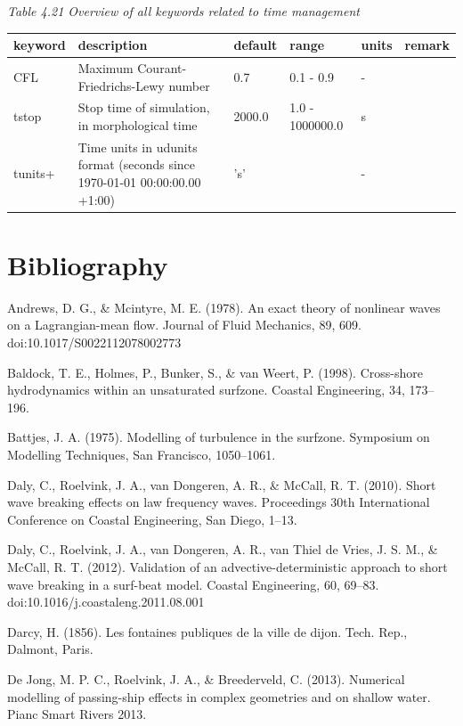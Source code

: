 \documentclass{article}
\begin{document}
\noindent \textit{Table 4.21 Overview of all keywords related to time management}

\begin{tabular}{|p{0.7in}|p{1.1in}|p{0.6in}|p{0.8in}|p{0.4in}|p{0.6in}|} \hline 
keyword & description & default & range & units & remark \\ \hline 
CFL & Maximum Courant-Friedrichs-Lewy number & 0.7 & 0.1 - 0.9 & - &  \\ \hline 
tstop & Stop time of simulation, in morphological time & 2000.0 & 1.0 - 1000000.0 & s &  \\ \hline 
tunits+ & Time units in udunits format (seconds since 1970-01-01 00:00:00.00 +1:00) & 's' &  & - &  \\ \hline 
\end{tabular}

\eject \textbf{}


\section{ Bibliography}

\noindent Andrews, D. G., \& Mcintyre, M. E. (1978). An exact theory of nonlinear waves on a Lagrangian-mean flow. Journal of Fluid Mechanics, 89, 609. doi:10.1017/S0022112078002773

\noindent Baldock, T. E., Holmes, P., Bunker, S., \& van Weert, P. (1998). Cross-shore hydrodynamics within an unsaturated surfzone. Coastal Engineering, 34, 173--196.

\noindent Battjes, J. A. (1975). Modelling of turbulence in the surfzone. Symposium on Modelling Techniques, San Francisco, 1050--1061.

\noindent Daly, C., Roelvink, J. A., van Dongeren, A. R., \& McCall, R. T. (2010). Short wave breaking effects on law frequency waves. Proceedings 30th International Conference on Coastal Engineering, San Diego, 1--13.

\noindent Daly, C., Roelvink, J. A., van Dongeren, A. R., van Thiel de Vries, J. S. M., \& McCall, R. T. (2012). Validation of an advective-deterministic approach to short wave breaking in a surf-beat model. Coastal Engineering, 60, 69--83. doi:10.1016/j.coastaleng.2011.08.001

\noindent Darcy, H. (1856). Les fontaines publiques de la ville de dijon. Tech. Rep., Dalmont, Paris.

\noindent De Jong, M. P. C., Roelvink, J. A., \& Breederveld, C. (2013). Numerical modelling of passing-ship effects in complex geometries and on shallow water. Pianc Smart Rivers 2013.
\end{document}
